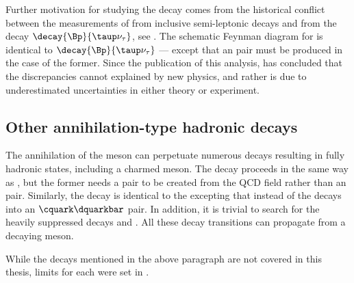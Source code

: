 Further motivation for studying the decay \btodsphi comes from the
historical conflict between the measurements of  from inclusive semi-leptonic decays and
from the decay $\decay{\Bp}{\taup\nu_\tau}$, see .
The schematic Feynman diagram for \btodsphi is identical to $\decay{\Bp}{\taup\nu_\tau}$
--- except that an \ssbar pair must be produced in the case of the former.
Since the publication of this analysis,  has concluded that the
discrepancies cannot explained by new physics, and rather is due to underestimated uncertainties in
either theory or experiment.









\subsection{Other annihilation-type hadronic decays}
The annihilation of the \Bp meson can perpetuate numerous decays resulting in fully hadronic
states, including a charmed meson.
The decay \decay{\Bp}{\Dp\Kstarz} proceeds in the same way as
\btodsphi, but the former needs a \ddbar pair to be created from the QCD field rather than an
\ssbar pair.
Similarly, the decay \decay{\Bp}{\Ds\Kstarzb} is identical to the \btodsphi excepting that instead
of \decay{\Wp}{\cquark\squarkbar} the \Wp decays into an $\cquark\dquarkbar$ pair.
In addition, it is trivial to search for the heavily suppressed decays
\decay{\Bp}{\Dp\Kstarzb} and \decay{\Bp}{\Ds\Kstarz}.
All these decay transitions can propagate from a decaying \Bc meson.

While the decays mentioned in the above paragraph are not covered in this thesis, limits for each
were set in .






























